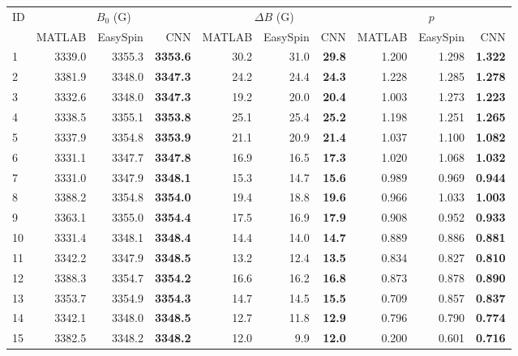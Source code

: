 \documentclass[a4paper,11pt]{article}
\begin{document}
\begin{longtable}{l rrr rrr rrr}
\toprule
ID & \multicolumn{3}{c}{$B_0$ (G)} & \multicolumn{3}{c}{$\Delta B$ (G)} & \multicolumn{3}{c}{$p$} \\
\cmidrule(lr){2-4} \cmidrule(lr){5-7} \cmidrule(lr){8-10}
 & MATLAB & EasySpin & CNN & MATLAB & EasySpin & CNN & MATLAB & EasySpin & CNN \\
\midrule
\endhead
  1 & 3339.0 & 3355.3 & \textbf{3353.6} & 30.2 & 31.0 & \textbf{29.8} & 1.200 & 1.298 & \textbf{1.322} \\
  2 & 3381.9 & 3348.0 & \textbf{3347.3} & 24.2 & 24.4 & \textbf{24.3} & 1.228 & 1.285 & \textbf{1.278} \\
  3 & 3332.6 & 3348.0 & \textbf{3347.3} & 19.2 & 20.0 & \textbf{20.4} & 1.003 & 1.273 & \textbf{1.223} \\
  4 & 3338.5 & 3355.1 & \textbf{3353.8} & 25.1 & 25.4 & \textbf{25.2} & 1.198 & 1.251 & \textbf{1.265} \\
  5 & 3337.9 & 3354.8 & \textbf{3353.9} & 21.1 & 20.9 & \textbf{21.4} & 1.037 & 1.100 & \textbf{1.082} \\
  6 & 3331.1 & 3347.7 & \textbf{3347.8} & 16.9 & 16.5 & \textbf{17.3} & 1.020 & 1.068 & \textbf{1.032} \\
  7 & 3331.0 & 3347.9 & \textbf{3348.1} & 15.3 & 14.7 & \textbf{15.6} & 0.989 & 0.969 & \textbf{0.944} \\
  8 & 3388.2 & 3354.8 & \textbf{3354.0} & 19.4 & 18.8 & \textbf{19.6} & 0.966 & 1.033 & \textbf{1.003} \\
  9 & 3363.1 & 3355.0 & \textbf{3354.4} & 17.5 & 16.9 & \textbf{17.9} & 0.908 & 0.952 & \textbf{0.933} \\
  10 & 3331.4 & 3348.1 & \textbf{3348.4} & 14.4 & 14.0 & \textbf{14.7} & 0.889 & 0.886 & \textbf{0.881} \\
  11 & 3342.2 & 3347.9 & \textbf{3348.5} & 13.2 & 12.4 & \textbf{13.5} & 0.834 & 0.827 & \textbf{0.810} \\
  12 & 3388.3 & 3354.7 & \textbf{3354.2} & 16.6 & 16.2 & \textbf{16.8} & 0.873 & 0.878 & \textbf{0.890} \\
  13 & 3353.7 & 3354.9 & \textbf{3354.3} & 14.7 & 14.5 & \textbf{15.5} & 0.709 & 0.857 & \textbf{0.837} \\
  14 & 3342.1 & 3348.0 & \textbf{3348.5} & 12.7 & 11.8 & \textbf{12.9} & 0.796 & 0.790 & \textbf{0.774} \\
  15 & 3382.5 & 3348.2 & \textbf{3348.2} & 12.0 & 9.9 & \textbf{12.0} & 0.200 & 0.601 & \textbf{0.716} \\

\end{longtable}
\end{document}
